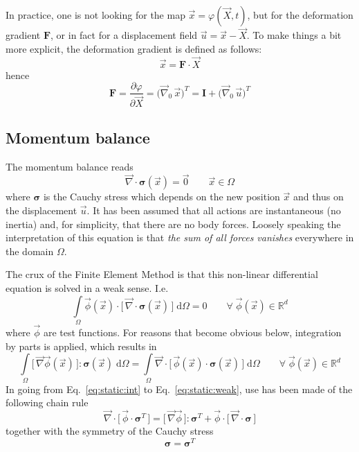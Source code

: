 \documentclass[times,namecite]{goose-article}
\begin{document}
In practice, one is not looking for the map $\vec{x} = \varphi(\vec{X},t)$, but for the deformation gradient $\bm{F}$,  or in fact for a displacement field $\vec{u} = \vec{x} - \vec{X}$. To make things a bit more explicit, the deformation gradient is defined as follows:
\begin{equation}
  \vec{x} = \bm{F} \cdot \vec{X}
\end{equation}
hence
\begin{equation}
  \bm{F}
  =
  \frac{\partial \varphi}{\partial \vec{X}}
  =
  \big( \vec{\nabla}_0 \, \vec{x} \big)^T
  =
  \bm{I} + \big( \vec{\nabla}_0 \, \vec{u} \big)^T
\end{equation}

\subsection{Momentum balance}

The momentum balance reads
\begin{equation}
\label{eq:static:momentum}
  \vec{\nabla} \cdot \bm{\sigma}(\vec{x}) = \vec{0}
  \qquad
  \vec{x} \in \Omega
\end{equation}
where $\bm{\sigma}$ is the Cauchy stress which depends on the new position $\vec{x}$ and thus on the displacement $\vec{u}$. It has been assumed that all actions are instantaneous (no inertia) and, for simplicity, that there are no body forces. Loosely speaking the interpretation of this equation is that \emph{the sum of all forces vanishes} everywhere in the domain $\Omega$.

The crux of the Finite Element Method is that this non-linear differential equation is solved in a weak sense. I.e.
\begin{equation}
\label{eq:static:int}
  \int\limits_\Omega
    \vec{\phi}(\vec{x}) \cdot \big[\, \vec{\nabla} \cdot \bm{\sigma}(\vec{x}) \,\big] \;
  \mathrm{d}\Omega
  =
  0
  \qquad
  \forall \; \vec{\phi}(\vec{x}) \in \mathbb{R}^d
\end{equation}
where $\vec{\phi}$ are test functions. For reasons that become obvious below, integration by parts is applied, which results in
\begin{equation}
\label{eq:static:weak}
  \int\limits_\Omega
    \big[\, \vec{\nabla} \vec{\phi}(\vec{x}) \,\big] : \bm{\sigma}(\vec{x}) \;
  \mathrm{d}\Omega
  =
  \int\limits_\Omega
    \vec{\nabla}
    \cdot
    \big[\, \vec{\phi}(\vec{x}) \cdot \bm{\sigma}(\vec{x}) \,\big] \;
  \mathrm{d}\Omega
  \qquad
  \forall \; \vec{\phi}(\vec{x}) \in \mathbb{R}^d
\end{equation}
In going from Eq.~\eqref{eq:static:int} to Eq.~\eqref{eq:static:weak}, use has been made of the following chain rule
\begin{equation}
  \vec{\nabla} \cdot \big[\, \vec{\phi} \cdot \bm{\sigma}^T \,\big]
  =
  \big[\, \vec{\nabla} \vec{\phi} \,\big] : \bm{\sigma}^T
  +
  \vec{\phi} \cdot \big[\, \vec{\nabla} \cdot \bm{\sigma} \,\big]
\end{equation}
together with the symmetry of the Cauchy stress
\begin{equation}
  \bm{\sigma} = \bm{\sigma}^T
\end{equation}
\end{document}
